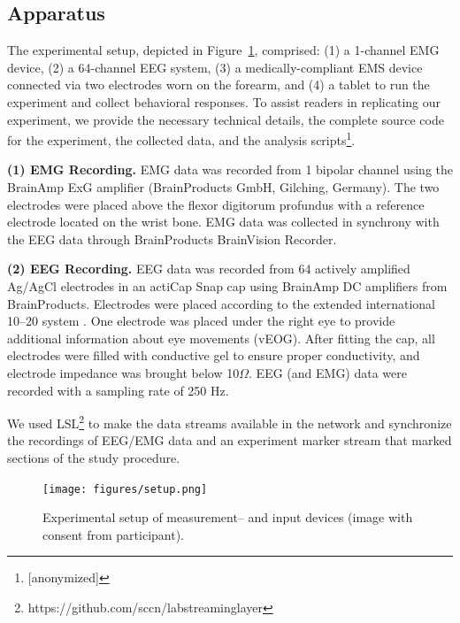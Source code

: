 \subsection{Apparatus}
The experimental setup, depicted in Figure~\ref{fig:setup}, comprised: (1) a 1-channel EMG device, (2) a 64-channel EEG system, (3) a medically-compliant EMS device connected via two electrodes worn on the forearm, and (4) a tablet to run the experiment and collect behavioral responses. To assist readers in replicating our experiment, we provide the necessary technical details, the complete source code for the experiment, the collected data, and the analysis scripts\footnote{[anonymized]}.

\indent\textbf{(1) EMG Recording.} EMG data was recorded from 1 bipolar channel using the BrainAmp ExG amplifier (BrainProducts GmbH, Gilching, Germany). The two electrodes were placed above the flexor digitorum profundus with a reference electrode located on the wrist bone. EMG data was collected in synchrony with the EEG data through BrainProducts BrainVision Recorder.

\indent\textbf{(2) EEG Recording.} EEG data was recorded from 64 actively amplified Ag/AgCl electrodes in an actiCap Snap cap using BrainAmp DC amplifiers from BrainProducts. Electrodes were placed according to the extended international 10–20 system \cite{Jasper1983-uw}. One electrode was placed under the right eye to provide additional information about eye movements (vEOG). After fitting the cap, all electrodes were filled with conductive gel to ensure proper conductivity, and electrode impedance was brought below 10$\Omega$. EEG (and EMG) data were recorded with a sampling rate of 250 Hz. 

We used LSL\footnote{https://github.com/sccn/labstreaminglayer} to make the data streams available in the network and synchronize the recordings of EEG/EMG data and an experiment marker stream that marked sections of the study procedure.

\begin{figure}[!h]
    \centering
    \texttt{[image: figures/setup.png]}
    \caption{Experimental setup of measurement-- and input devices (image with consent from participant).}
    \label{fig:setup}
\end{figure}

